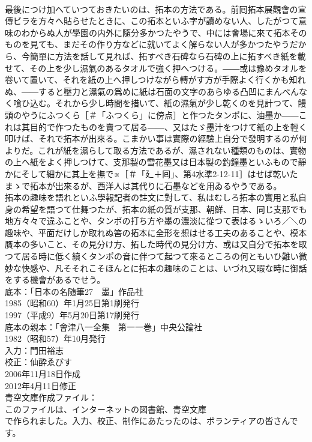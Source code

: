 \documentclass[8pt]{extreport}
\begin{document}
\begin{CJK}{UTF8}{min}
\\	最後につけ加へていつておきたいのは、拓本の方法である。前囘拓本展觀會の宣傳ビラを方々へ貼らせたときに、この拓本といふ字が讀めない人、したがつて意味のわからぬ人が學園の内外に隨分多かつたやうで、中には會場に來て拓本そのものを見ても、まだその作り方などに就いてよく解らない人が多かつたやうだから、今簡單に方法を話して見れば、拓すべき石碑なら石碑の上に拓すべき紙を載せて、その上を少し濕氣のあるタオルで強く押へつける。――或は豫めタオルを卷いて置いて、それを紙の上へ押しつけながら轉がす方が手際よく行くかも知れぬ、――すると壓力と濕氣の爲めに紙は石面の文字のあらゆる凸凹にまんべんなく喰ひ込む。それから少し時間を措いて、紙の濕氣が少し乾くのを見計つて、饅頭のやうにふつくら［＃「ふつくら」に傍点］と作つたタンポに、油墨か――これは其目的で作つたものを賣つて居る――、又はたゞ墨汁をつけて紙の上を輕く叩けば、それで拓本が出來る。こまかい事は實際の經驗上自分で發明するのが何よりだ。これが紙を濕らして取る方法であるが、濕されない種類のものは、實物の上へ紙をよく押しつけて、支那製の雪花墨又は日本製の釣鐘墨といふもので靜かにそして細かに其上を撫で※［＃「廴＋囘」、第4水準2-12-11］はせば乾いたまゝで拓本が出來るが、西洋人は其代りに石墨などを用ゐるやうである。
\\	拓本の趣味を語れといふ學報記者の註文に對して、私はむしろ拓本の實用と私自身の希望を語つて仕舞つたが、拓本の紙の質が支那、朝鮮、日本、同じ支那でも地方々々で違ふことや、タンポの打ち方や墨の濃淡に從つて表はるゝいろ／＼の趣味や、平面だけしか取れぬ筈の拓本に全形を想はせる工夫のあることや、模本贋本の多いこと、その見分け方、拓した時代の見分け方、或は又自分で拓本を取つて居る時に低く續くタンポの音に伴つて起つて來るところの何ともいひ難い微妙な快感や、凡そそれこそほんとに拓本の趣味のことは、いづれ又暇な時に御話をする機會があるでせう。
\\	底本：「日本の名随筆27　墨」作品社
\\	1985（昭和60）年1月25日第1刷発行
\\	1997（平成9）年5月20日第17刷発行
\\	底本の親本：「會津八一全集　第一一巻」中央公論社
\\	1982（昭和57）年10月発行
\\	入力：門田裕志
\\	校正：仙酔ゑびす
\\	2006年11月18日作成
\\	2012年4月11日修正
\\	青空文庫作成ファイル：
\\	このファイルは、インターネットの図書館、青空文庫
\\	で作られました。入力、校正、制作にあたったのは、ボランティアの皆さんです。
\end{CJK}
\end{document}

